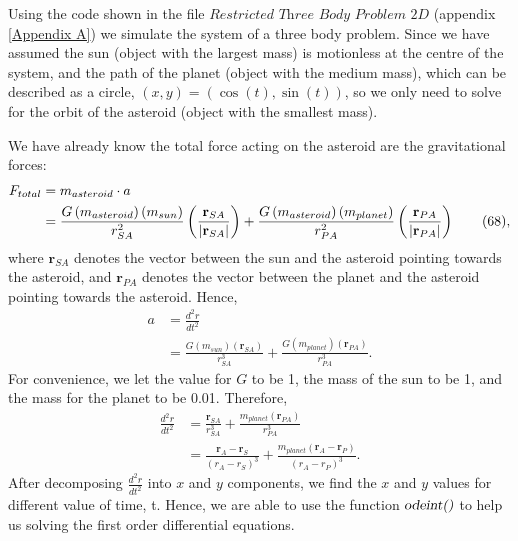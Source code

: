 Using the code shown in the file $\textit{Restricted Three Body Problem 2D}$ (appendix \ref{Appendix A}) we simulate the system of a three body problem. Since we have assumed the sun (object with the largest mass) is motionless at the centre of the system, and the path of the planet (object with the medium mass), which can be described as a circle, $(x,y) = (\cos(t),\sin(t))$, so we only need to solve for the orbit of the asteroid (object with the smallest mass).

We have already know the total force acting on the asteroid are the gravitational forces:
\begin{align}
    F_{total} 
    & = m_{asteroid} \cdot a \notag \\
    & = \frac{G \left( m_{asteroid} \right) \left( m_{sun} \right)}{r_{SA}^2} \left( \frac{\mathbf{r}_{SA}}{\left| \mathbf{r}_{SA} \right|} \right) + \frac{G \left( m_{asteroid} \right) \left( m_{planet} \right)}{r_{PA}^2} \left( \frac{\mathbf{r}_{PA}}{\left| \mathbf{r}_{PA} \right|} \right) \tag{68},
\end{align}
where $\mathbf{r}_{SA}$ denotes the vector between the sun and the asteroid pointing towards the asteroid, and $\mathbf{r}_{PA}$ denotes the vector between the planet and the asteroid pointing towards the asteroid. Hence,
\begin{align*}
    a 
    & = \frac{d^2 r}{d t^2} \\
    & = \frac{G \left( m_{sun} \right) \left( \mathbf{r}_{SA} \right)}{r_{SA}^3} + \frac{G \left( m_{planet} \right) \left( \mathbf{r}_{PA} \right)}{r_{PA}^3} \tag{69}.
\end{align*}
For convenience, we let the value for $G$ to be 1, the mass of the sun to be 1, and the mass for the planet to be 0.01. Therefore,
\begin{align*}
    \frac{d^2 r}{d t^2} 
    & = \frac{\mathbf{r}_{SA}}{r_{SA}^3} + \frac{m_{planet} \left( \mathbf{r}_{PA} \right)}{r_{PA}^3} \\
    & = \frac{\mathbf{r}_{A} - \mathbf{r}_{S}}{(r_{A} - r_{S})^3} + \frac{m_{planet} (\mathbf{r}_{A} - \mathbf{r}_{P})}{(r_{A} - r_{P})^3} \tag{70}.
\end{align*}
After decomposing $\frac{d^2 r}{d t^2}$ into $x$ and $y$ components, we find the $x$ and $y$ values for different value of time, t. Hence, we are able to use the function $\textsl{odeint()}$ to help us solving the first order differential equations.



